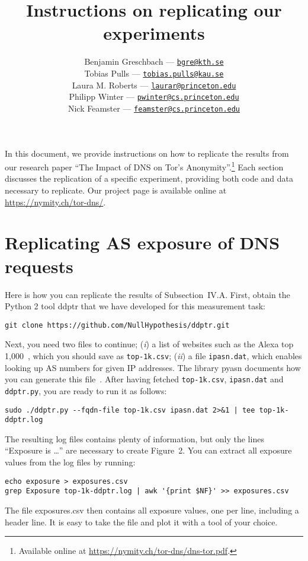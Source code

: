 \documentclass{article}
\title{Instructions on replicating our experiments}
\author{%
	Benjamin Greschbach --- \href{mailto:bgre@kth.se}{\nolinkurl{bgre@kth.se}} \\
	Tobias Pulls --- \href{mailto:tobias.pulls@kau.se}{\nolinkurl{tobias.pulls@kau.se}} \\
	Laura M. Roberts --- \href{mailto:laurar@princeton.edu}{\nolinkurl{laurar@princeton.edu}} \\
	Philipp Winter --- \href{mailto:pwinter@cs.princeton.edu}{\nolinkurl{pwinter@cs.princeton.edu}} \\
	Nick Feamster --- \href{mailto:feamster@cs.princeton.edu}{\nolinkurl{feamster@cs.princeton.edu}}
}
\newcommand{\first}{(\emph{i})\xspace}
\newcommand{\second}{(\emph{ii})\xspace}
\begin{document}
\maketitle

In this document, we provide instructions on how to replicate the results from
our research paper ``The Impact of DNS on Tor's Anonymity''.\footnote{Available
online at \url{https://nymity.ch/tor-dns/dns-tor.pdf}.} Each section discusses
the replication of a specific experiment, providing both code and data necessary
to replicate.  Our project page is available online at
\url{https://nymity.ch/tor-dns/}.

\tableofcontents

\newpage

\section{Replicating AS exposure of DNS requests}
Here is how you can replicate the results of Subsection~IV.A.  First, obtain the
Python 2 tool ddptr that we have developed for this measurement task:

\begin{lstlisting}
git clone https://github.com/NullHypothesis/ddptr.git
\end{lstlisting}

Next, you need two files to continue; \first a list of websites such as the
Alexa top 1,000~\cite{alexatop1k}, which you should save as {\tt top-1k.csv};
\second a file {\tt ipasn.dat}, which enables looking up AS numbers for given IP
addresses.  The library pyasn documents how you can generate this
file~\cite{pyasn}.  After having fetched {\tt top-1k.csv}, {\tt ipasn.dat} and
{\tt ddptr.py}, you are ready to run it as follows:

\begin{lstlisting}
sudo ./ddptr.py --fqdn-file top-1k.csv ipasn.dat 2>&1 | tee top-1k-ddptr.log
\end{lstlisting}

The resulting log files contains plenty of information, but only the lines
``Exposure is \ldots'' are necessary to create Figure~2.  You can extract all
exposure values from the log files by running:

\begin{lstlisting}
echo exposure > exposures.csv
grep Exposure top-1k-ddptr.log | awk '{print $NF}' >> exposures.csv
\end{lstlisting}

The file exposures.csv then contains all exposure values, one per line,
including a header line.  It is easy to take the file and plot it with a tool of
your choice.
\end{document}

